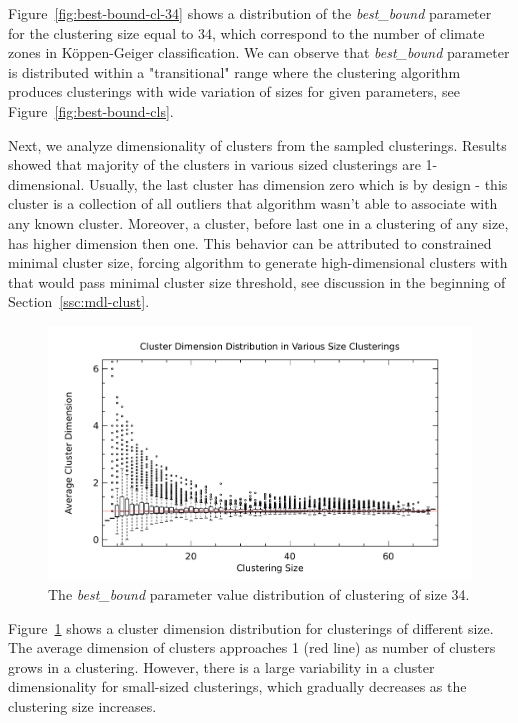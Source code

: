 Figure~\ref{fig:best-bound-cl-34} shows a distribution of the \emph{best\_bound}
parameter for the clustering size equal to 34, which correspond to the number of
climate zones in K{\"o}ppen-Geiger classification. We can observe that
\emph{best\_bound} parameter is distributed within a "transitional" range where
the clustering algorithm produces clusterings with wide variation of sizes for
given parameters, see Figure~\ref{fig:best-bound-cls}.


Next, we analyze dimensionality of clusters from the sampled clusterings.
Results showed that majority of the clusters in various sized clusterings are
1-dimensional. Usually, the last cluster has dimension zero which is by design -
this cluster is a collection of all outliers that algorithm wasn't able to
associate with any known cluster.
Moreover, a cluster, before last one in a clustering of any size,
has higher dimension then one. This behavior can be attributed to constrained
minimal cluster size, forcing algorithm to generate high-dimensional clusters
with that would pass minimal cluster size threshold, see discussion in
the beginning of Section~\ref{ssc:mdl-clust}.

\begin{figure}[H]
\center
\includegraphics[width=6.0in]{img/mdl-clust_mdl-clust-cdim_1.pdf}
\caption{The \emph{best\_bound} parameter value distribution of clustering of size 34.}
\label{fig:mdl-clust-cdim}
\end{figure}



Figure~\ref{fig:mdl-clust-cdim} shows a cluster dimension distribution for
clusterings of different size. The average dimension of clusters approaches 1
(red line) as number of clusters grows in a clustering. However, there is
a large variability in a cluster dimensionality for small-sized clusterings,
which gradually decreases as the clustering size increases.


